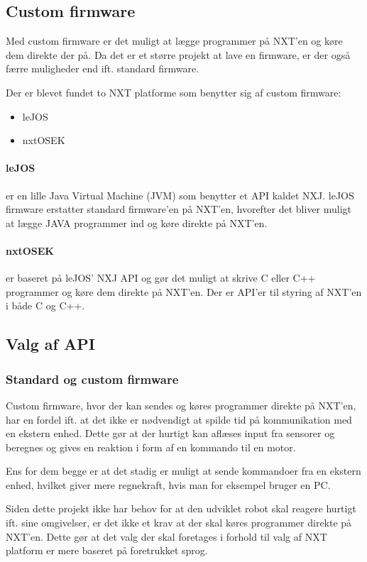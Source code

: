 \subsection{Custom firmware}
Med custom firmware er det muligt at lægge programmer på NXT'en og køre dem direkte der på.
Da det er et større projekt at lave en firmware, er der også færre muligheder end ift. standard firmware.

Der er blevet fundet to NXT platforme som benytter sig af custom firmware:
\begin{itemize}
\item{leJOS}
\item{nxtOSEK}
\end{itemize}

\paragraph{leJOS} er en lille Java Virtual Machine (JVM) som benytter et API kaldet NXJ.
leJOS firmware erstatter standard firmware'en på NXT'en, hvorefter det bliver muligt at lægge JAVA programmer ind og køre direkte på NXT'en.\cite{lejos}

\paragraph{nxtOSEK} er baseret på leJOS' NXJ API og gør det muligt at skrive C eller C++ programmer og køre dem direkte på NXT'en.
Der er API'er til styring af NXT'en i både C og C++.\cite{nxtosek}

\subsection{Valg af API}

\subsubsection{Standard og custom firmware}
Custom firmware, hvor der kan sendes og køres programmer direkte på NXT'en, har en fordel ift. at det ikke er nødvendigt at spilde tid på kommunikation med en ekstern enhed.
Dette gør at der hurtigt kan aflæses input fra sensorer og beregnes og gives en reaktion i form af en kommando til en motor.

Ens for dem begge er at det stadig er muligt at sende kommandoer fra en ekstern enhed, hvilket giver mere regnekraft, hvis man for eksempel bruger en PC.

Siden dette projekt ikke har behov for at den udviklet robot skal reagere hurtigt ift. sine omgivelser, er det ikke et krav at der skal køres programmer direkte på NXT'en.
Dette gør at det valg der skal foretages i forhold til valg af NXT platform er mere baseret på foretrukket sprog.

